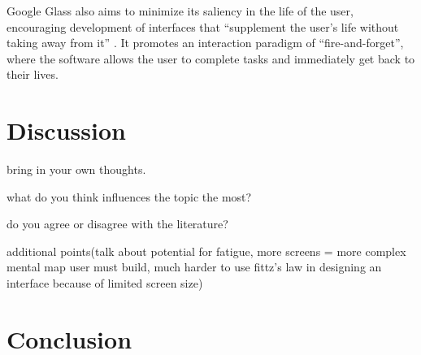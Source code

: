 \documentclass[12pt]{article}
\begin{document}
Google Glass also aims to minimize its saliency in the life of the user, encouraging development of interfaces that ``supplement the user's life without taking away from it'' \cite{goog}. It promotes an interaction paradigm of ``fire-and-forget'', where the software allows the user to complete tasks and immediately get back to their lives.

\section{Discussion}

bring in your own thoughts. 

what do you think influences the topic the most?

do you agree or disagree with the literature?

additional points(talk about potential for fatigue, more screens = more complex mental map user must build, much harder to use fittz's law in designing an interface because of limited screen size)

\section{Conclusion}



\end{document}
